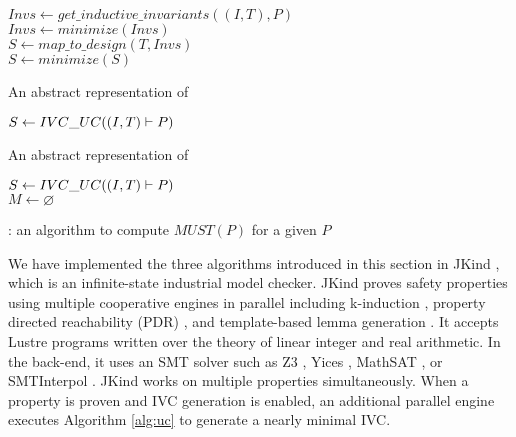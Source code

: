 \begin{algorithm}
  \BlankLine
  $Invs \leftarrow get\_inductive\_invariants((I, T), P)$ \\
  $Invs \leftarrow minimize(Invs)$ \\
  $S \leftarrow map\_to\_design (T, Invs)$ \\
  $S \leftarrow minimize(S)$ \\
\caption{An abstract representation of \ucalg \cite{Ghass16}}
\label{alg:uc}
\end{algorithm}

\begin{algorithm}
  \BlankLine
  $S \leftarrow {IVC\_UC}((I, T) \vdash P)$ \\
   {
  }
\caption{An abstract representation of \ucbfalg \cite{Ghass16}}
\label{alg:ucbf}
\end{algorithm}


\begin{algorithm}
  \BlankLine
  $S \leftarrow {IVC\_UC}((I, T) \vdash P)$ \\
  $M \leftarrow \varnothing$ \\
   {
  }
\caption{\mustalg: an algorithm to compute $MUST(P)$ for a given $P$}
\label{alg:must}
\end{algorithm}

We have implemented the three algorithms introduced in this section in JKind \cite{jkind}, which is an infinite-state industrial model checker. JKind proves safety properties using multiple cooperative engines in parallel including k-induction \cite{SheeranSS00}, property directed reachability (PDR) \cite{Een2011:PDR}, and template-based lemma generation \cite{Kahsai2011}. It accepts
Lustre programs written over the theory of linear integer and real
arithmetic. In the back-end, it uses an SMT solver such as
Z3 \cite{DeMoura08:z3}, Yices \cite{Dutertre06:yices},
MathSAT \cite{Cimatti2013:MathSAT}, or SMTInterpol \cite{Christ2012:SMTInterpol}.
JKind works on multiple properties simultaneously. When a
property is proven and IVC generation is enabled, an additional
parallel engine executes Algorithm \ref{alg:uc} to generate a nearly minimal
IVC.

